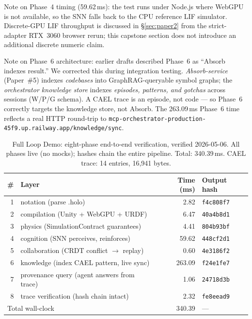 \documentclass[sigchi-a]{acmart}
\providecommand{\measuredFrom}[1]{}
\begin{document}
Note on Phase~4 timing (59.62\,ms): the test runs under Node.js where
WebGPU is not available, so the SNN falls back to the CPU reference LIF
simulator. Discrete-GPU LIF throughput is discussed in \S\ref{sec:paper2}
from the strict-adapter RTX~3060 browser rerun; this capstone section does
not introduce an additional discrete numeric claim.

Note on Phase~6 architecture: earlier drafts described Phase~6 as
``Absorb indexes result.'' We corrected this during integration
testing. \emph{Absorb-service} (Paper~\#5) indexes \emph{codebases} into
GraphRAG-queryable symbol graphs; the \emph{orchestrator knowledge store}
indexes \emph{episodes, patterns, and gotchas} across sessions (W/P/G
schema). A CAEL trace is an episode, not code --- so Phase~6 correctly
targets the knowledge store, not Absorb. The 263.09\,ms Phase~6 time reflects
a real HTTP round-trip to
\texttt{mcp-orchestrator-production-45f9.up.railway.app/knowledge/sync}.

\begin{table}[t]
\centering
\caption{Full Loop Demo: eight-phase end-to-end verification, verified
2026-05-06. All phases live (no mocks); hashes chain the entire pipeline.
Total: 340.39\,ms. CAEL trace: 14 entries, 16{,}941 bytes.}
\label{tab:full-loop-timings}
\small
\measuredFrom{HoloScript/packages/engine/src/simulation/__tests__/paper-full-loop-demo.test.ts}%
\begin{tabular}{rlrl}
\toprule
\# & Layer & Time (ms) & Output hash \\
\midrule
1 & notation (parse .holo)                     & 2.82   & \texttt{f4c808f7} \\
2 & compilation (Unity + WebGPU + URDF)        & 6.47   & \texttt{40a4b8d1} \\
3 & physics (SimulationContract guarantees)    & 4.41   & \texttt{804b93bf} \\
4 & cognition (SNN perceives, reinforces)      & 59.62  & \texttt{448cf2d1} \\
5 & collaboration (CRDT conflict $\to$ replay) & 0.60   & \texttt{4e3186f2} \\
6 & knowledge (index CAEL pattern, live sync)  & 263.09 & \texttt{f24e1fe7} \\
7 & provenance query (agent answers from trace)& 1.06   & \texttt{24718d3b} \\
8 & trace verification (hash chain intact)     & 2.32   & \texttt{fe8eead9} \\
\midrule
\multicolumn{2}{l}{Total wall-clock}           & 340.39 & --- \\
\bottomrule
\end{tabular}
\end{table}
\end{document}
